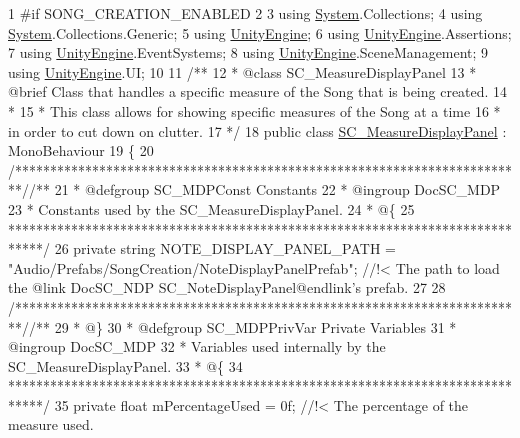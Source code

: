 \begin{DoxyCodeInclude}
1 \textcolor{preprocessor}{#if SONG\_CREATION\_ENABLED}
2 
3 \textcolor{keyword}{using} \hyperlink{namespace_system}{System}.Collections;
4 \textcolor{keyword}{using} \hyperlink{namespace_system}{System}.Collections.Generic;
5 \textcolor{keyword}{using} \hyperlink{namespace_unity_engine}{UnityEngine};
6 \textcolor{keyword}{using} \hyperlink{namespace_unity_engine}{UnityEngine}.Assertions;
7 \textcolor{keyword}{using} \hyperlink{namespace_unity_engine}{UnityEngine}.EventSystems;
8 \textcolor{keyword}{using} \hyperlink{namespace_unity_engine}{UnityEngine}.SceneManagement;
9 \textcolor{keyword}{using} \hyperlink{namespace_unity_engine}{UnityEngine}.UI;
10 \textcolor{comment}{}
11 \textcolor{comment}{/**}
12 \textcolor{comment}{ * @class SC\_MeasureDisplayPanel}
13 \textcolor{comment}{ * @brief Class that handles a specific measure of the Song that is being created.}
14 \textcolor{comment}{ * }
15 \textcolor{comment}{ * This class allows for showing specific measures of the Song at a time}
16 \textcolor{comment}{ * in order to cut down on clutter.}
17 \textcolor{comment}{*/}
18 \textcolor{keyword}{public} \textcolor{keyword}{class }\hyperlink{class_s_c___measure_display_panel}{SC\_MeasureDisplayPanel} : MonoBehaviour
19 \{
20     \textcolor{comment}{/*************************************************************************/}\textcolor{comment}{/** }
21 \textcolor{comment}{    * @defgroup SC\_MDPConst Constants}
22 \textcolor{comment}{    * @ingroup DocSC\_MDP}
23 \textcolor{comment}{    * Constants used by the SC\_MeasureDisplayPanel.}
24 \textcolor{comment}{    * @\{}
25 \textcolor{comment}{    *****************************************************************************/}
26     \textcolor{keyword}{private} \textcolor{keywordtype}{string} NOTE\_DISPLAY\_PANEL\_PATH = \textcolor{stringliteral}{"Audio/Prefabs/SongCreation/NoteDisplayPanelPrefab"}; \textcolor{comment}{//!< The
       path to load the @link DocSC\_NDP SC\_NoteDisplayPanel@endlink's prefab.}
27 \textcolor{comment}{}
28     \textcolor{comment}{/*************************************************************************/}\textcolor{comment}{/** }
29 \textcolor{comment}{    * @\}}
30 \textcolor{comment}{    * @defgroup SC\_MDPPrivVar Private Variables}
31 \textcolor{comment}{    * @ingroup DocSC\_MDP}
32 \textcolor{comment}{    * Variables used internally by the SC\_MeasureDisplayPanel.}
33 \textcolor{comment}{    * @\{}
34 \textcolor{comment}{    *****************************************************************************/}
35     \textcolor{keyword}{private} \textcolor{keywordtype}{float} mPercentageUsed = 0f; \textcolor{comment}{//!< The percentage of the measure used.}

\end{DoxyCodeInclude}
